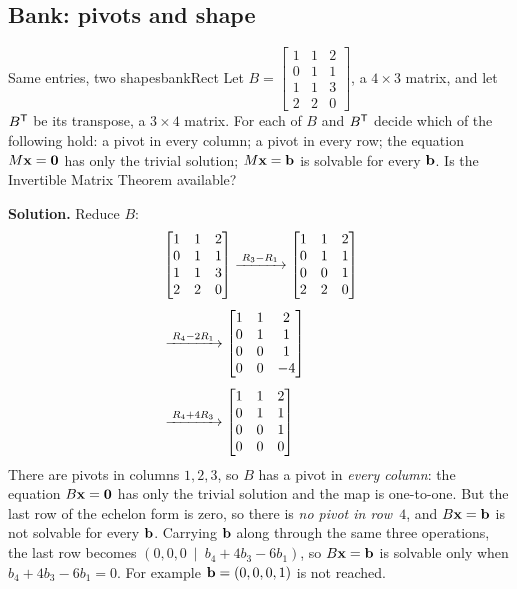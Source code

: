 \documentclass[11pt]{article}
\begin{document}
\subsection*{Bank: pivots and shape}

\begin{exmp}{Same entries, two shapes}{bankRect}
Let $B=\begin{bmatrix}1&1&2\\0&1&1\\1&1&3\\2&2&0\end{bmatrix}$, a $4\times3$ matrix, and let $B^{\mathsf T}$ be its transpose, a $3\times4$ matrix. For each of $B$ and $B^{\mathsf T}$ decide which of the following hold: a pivot in every column; a pivot in every row; the equation $M\mathbf{x}=\mathbf{0}$ has only the trivial solution; $M\mathbf{x}=\mathbf{b}$ is solvable for every $\mathbf{b}$. Is the Invertible Matrix Theorem available?

\textbf{Solution.} Reduce $B$:
\begin{align*}
&\begin{bmatrix}1&1&2\\0&1&1\\1&1&3\\2&2&0\end{bmatrix}
\xrightarrow{\;R_3-R_1\;}
\begin{bmatrix}1&1&2\\0&1&1\\0&0&1\\2&2&0\end{bmatrix}\\[4pt]
&\xrightarrow{\;R_4-2R_1\;}
\begin{bmatrix}1&1&2\\0&1&1\\0&0&1\\0&0&-4\end{bmatrix}\\[4pt]
&\xrightarrow{\;R_4+4R_3\;}
\begin{bmatrix}1&1&2\\0&1&1\\0&0&1\\0&0&0\end{bmatrix}
\end{align*}
There are pivots in columns $1,2,3$, so $B$ has a pivot in \emph{every column}: the equation $B\mathbf{x}=\mathbf{0}$ has only the trivial solution and the map is one-to-one. But the last row of the echelon form is zero, so there is \emph{no pivot in row~$4$}, and $B\mathbf{x}=\mathbf{b}$ is not solvable for every $\mathbf{b}$. Carrying $\mathbf{b}$ along through the same three operations, the last row becomes $(0,0,0\ \mid\ b_4+4b_3-6b_1)$, so $B\mathbf{x}=\mathbf{b}$ is solvable only when $b_4+4b_3-6b_1=0$. For example $\mathbf{b}=(0,0,0,1)$ is not reached.


\end{exmp}
\end{document}
